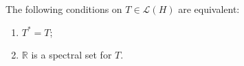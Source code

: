The following conditions on $T \in \mathcal{L}(H)$ are equivalent:
\begin{enumerate}
\item[(a)] $T^* = T$;
\item[(b)] $\mathbb{R}$ is a spectral set for $T$.
\end{enumerate}
